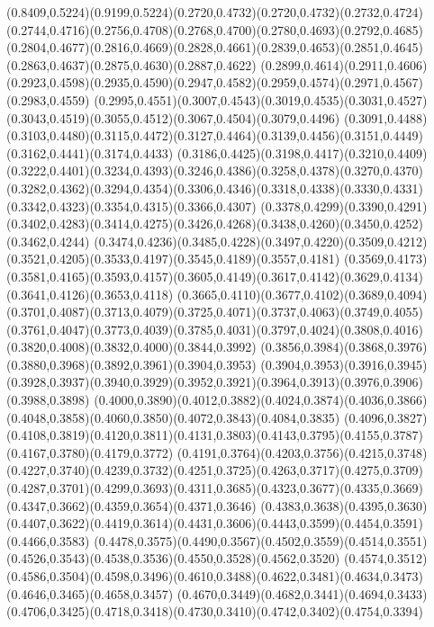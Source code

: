\PST@Solid(0.8409,0.5224)(0.9199,0.5224)\PST@Solid(0.2720,0.4732)(0.2720,0.4732)(0.2732,0.4724)(0.2744,0.4716)(0.2756,0.4708)(0.2768,0.4700)(0.2780,0.4693)(0.2792,0.4685)
(0.2804,0.4677)(0.2816,0.4669)(0.2828,0.4661)(0.2839,0.4653)(0.2851,0.4645)(0.2863,0.4637)(0.2875,0.4630)(0.2887,0.4622)
(0.2899,0.4614)(0.2911,0.4606)(0.2923,0.4598)(0.2935,0.4590)(0.2947,0.4582)(0.2959,0.4574)(0.2971,0.4567)(0.2983,0.4559)
(0.2995,0.4551)(0.3007,0.4543)(0.3019,0.4535)(0.3031,0.4527)(0.3043,0.4519)(0.3055,0.4512)(0.3067,0.4504)(0.3079,0.4496)
(0.3091,0.4488)(0.3103,0.4480)(0.3115,0.4472)(0.3127,0.4464)(0.3139,0.4456)(0.3151,0.4449)(0.3162,0.4441)(0.3174,0.4433)
(0.3186,0.4425)(0.3198,0.4417)(0.3210,0.4409)(0.3222,0.4401)(0.3234,0.4393)(0.3246,0.4386)(0.3258,0.4378)(0.3270,0.4370)
(0.3282,0.4362)(0.3294,0.4354)(0.3306,0.4346)(0.3318,0.4338)(0.3330,0.4331)(0.3342,0.4323)(0.3354,0.4315)(0.3366,0.4307)
(0.3378,0.4299)(0.3390,0.4291)(0.3402,0.4283)(0.3414,0.4275)(0.3426,0.4268)(0.3438,0.4260)(0.3450,0.4252)(0.3462,0.4244)
(0.3474,0.4236)(0.3485,0.4228)(0.3497,0.4220)(0.3509,0.4212)(0.3521,0.4205)(0.3533,0.4197)(0.3545,0.4189)(0.3557,0.4181)
(0.3569,0.4173)(0.3581,0.4165)(0.3593,0.4157)(0.3605,0.4149)(0.3617,0.4142)(0.3629,0.4134)(0.3641,0.4126)(0.3653,0.4118)
(0.3665,0.4110)(0.3677,0.4102)(0.3689,0.4094)(0.3701,0.4087)(0.3713,0.4079)(0.3725,0.4071)(0.3737,0.4063)(0.3749,0.4055)
(0.3761,0.4047)(0.3773,0.4039)(0.3785,0.4031)(0.3797,0.4024)(0.3808,0.4016)(0.3820,0.4008)(0.3832,0.4000)(0.3844,0.3992)
(0.3856,0.3984)(0.3868,0.3976)(0.3880,0.3968)(0.3892,0.3961)(0.3904,0.3953)
\PST@Solid(0.3904,0.3953)(0.3916,0.3945)(0.3928,0.3937)(0.3940,0.3929)(0.3952,0.3921)(0.3964,0.3913)(0.3976,0.3906)(0.3988,0.3898)
(0.4000,0.3890)(0.4012,0.3882)(0.4024,0.3874)(0.4036,0.3866)(0.4048,0.3858)(0.4060,0.3850)(0.4072,0.3843)(0.4084,0.3835)
(0.4096,0.3827)(0.4108,0.3819)(0.4120,0.3811)(0.4131,0.3803)(0.4143,0.3795)(0.4155,0.3787)(0.4167,0.3780)(0.4179,0.3772)
(0.4191,0.3764)(0.4203,0.3756)(0.4215,0.3748)(0.4227,0.3740)(0.4239,0.3732)(0.4251,0.3725)(0.4263,0.3717)(0.4275,0.3709)
(0.4287,0.3701)(0.4299,0.3693)(0.4311,0.3685)(0.4323,0.3677)(0.4335,0.3669)(0.4347,0.3662)(0.4359,0.3654)(0.4371,0.3646)
(0.4383,0.3638)(0.4395,0.3630)(0.4407,0.3622)(0.4419,0.3614)(0.4431,0.3606)(0.4443,0.3599)(0.4454,0.3591)(0.4466,0.3583)
(0.4478,0.3575)(0.4490,0.3567)(0.4502,0.3559)(0.4514,0.3551)(0.4526,0.3543)(0.4538,0.3536)(0.4550,0.3528)(0.4562,0.3520)
(0.4574,0.3512)(0.4586,0.3504)(0.4598,0.3496)(0.4610,0.3488)(0.4622,0.3481)(0.4634,0.3473)(0.4646,0.3465)(0.4658,0.3457)
(0.4670,0.3449)(0.4682,0.3441)(0.4694,0.3433)(0.4706,0.3425)(0.4718,0.3418)(0.4730,0.3410)(0.4742,0.3402)(0.4754,0.3394)
